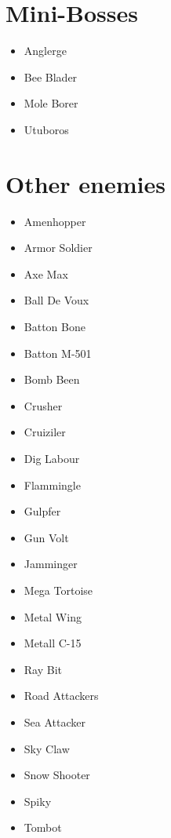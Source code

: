 \section{Mini-Bosses}
	\begin{itemize}
		\item \hypertarget{miniboss:Anglerge}{Anglerge}
		\item \hypertarget{miniboss:Bee_Blader}{Bee Blader}
		\item \hypertarget{subboss:Mole Borer}{Mole Borer}
		\item \hypertarget{miniboss:Utuboros}{Utuboros}
	\end{itemize}

\section{Other enemies}
\begin{itemize}
	\item \hypertarget{enem:Amenhopper}{Amenhopper}
	\item \hypertarget{enem:Armor_Soldier}{Armor Soldier}
	\item \hypertarget{enem:Axe_Max}{Axe Max}
	\item \hypertarget{enem:Ball_De_Voux}{Ball De Voux}
	\item \hypertarget{enem:Batton_Bone}{Batton Bone}
	\item \hypertarget{enem:Batton_M-501}{Batton M-501} 
	\item \hypertarget{enem:Bomb_Been}{Bomb Been}
	\item \hypertarget{enem:Crusher}{Crusher}
	\item \hypertarget{enem:Cruiziler}{Cruiziler}
	\item \hypertarget{enem:Dig_Labour}{Dig Labour} 
	\item \hypertarget{enem:Flammingle}{Flammingle}
	\item \hypertarget{enem:Gulpfer}{Gulpfer}
	\item \hypertarget{enem:Gun_Volt}{Gun Volt}
	\item \hypertarget{enem:Jamminger}{Jamminger}
	\item \hypertarget{enem:Mega_Tortoise}{Mega Tortoise}
	\item \hypertarget{enem:Metal_Wing}{Metal Wing}
	\item \hypertarget{enem:Metall_C-15}{Metall C-15} 
	\item \hypertarget{enem:Ray_Bit}{Ray Bit}
	\item \hypertarget{enem:Road_Attackers}{Road Attackers}
	\item \hypertarget{enem:Sea_Attacker}{Sea Attacker}
	\item \hypertarget{enem:Sky_Claw}{Sky Claw}
	\item \hypertarget{enem:Snow_Shooter}{Snow Shooter}
	\item \hypertarget{enem:Spiky}{Spiky}
	\item \hypertarget{enem:Tombot}{Tombot}

\end{itemize}
